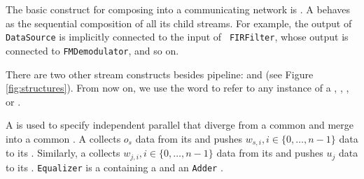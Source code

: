 


The basic construct for composing \filters into a communicating
network is {\pipeline}.  A {\pipeline} behaves as the sequential
composition of all its child streams.  For example, the output of
{\tt DataSource} is implicitly connected to the input of {\tt
FIRFilter}, whose output is connected to {\tt FMDemodulator}, and
so on.

There are two other stream constructs besides pipeline:
{\splitjoin} and {\feedbackloop} (see Figure
\ref{fig:structures}). From now on, we use the word {\stream} to
refer to any instance of a {\filter}, {\pipeline}, {\splitjoin},
or {\feedbackloop}.

A {\splitjoin} is used to specify independent parallel {\streams}
that diverge from a common {\splitter} and merge into a common
{\joiner}. A {\splitter} collects $o_s$ data from its {\Input}
{\Channel} and pushes $w_{s,i}, i \in \{0,\dots,n-1\}$ data to its
{\Output} {\Channels}. Similarly, a {\joiner} collects $w_{j,i}, i
\in \{0,\dots,n-1\}$ data from its {\Input} {\Channel} and pushes
$u_j$ data to its {\Output} {\Channel}. {\tt Equalizer} is a
\pipeline containing a \splitjoin and an {\tt Adder} \filter.

